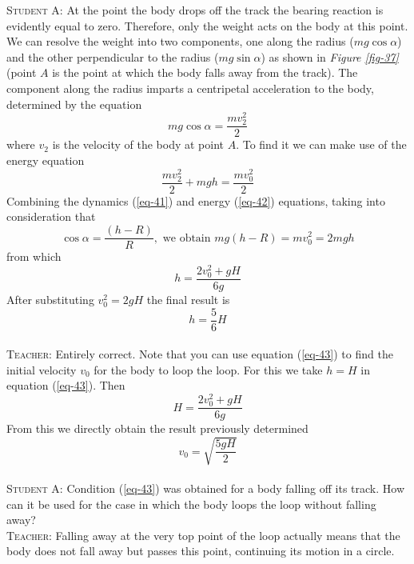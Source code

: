 \documentclass[a4paper,sfsidenotes]{tufte-book}
\begin{document}
\textsc{Student A:} At the point the body drops off the track the bearing reaction is evidently equal to zero. Therefore, only the weight acts on the body at this point. We can resolve the weight into two components, one along the radius ($mg \cos \alpha$) and the other perpendicular to the radius ($mg \sin \alpha$) as shown in \emph{Figure \ref{fig-37}} (point $A$ is the point at which the body falls away from the track). The component along the radius imparts a centripetal acceleration to the body, determined by the equation
\begin{equation}
mg \cos \alpha = \frac{mv_{2}^{2}}{2}
\label{eq-41}
\end{equation}
where $v_{2}$ is the velocity of the body at point $A$. To find it we can make use of the energy equation
\begin{equation}
\frac{mv_{2}^{2}}{2} + mgh = \frac{mv_{0}^{2}}{2} 
\label{eq-42}
\end{equation}
Combining the dynamics (\ref{eq-41}) and energy (\ref{eq-42}) equations, taking into consideration that 
\begin{equation*}
\cos \alpha = \frac{(h-R)}{R}, \, \, \text{we obtain} \, \, mg(h-R) = mv_{0}^{2} = 2mgh
\end{equation*}
from which
\begin{equation}
h = \frac{2v_{0}^{2}+gH}{6g} 
\label{eq-43}
\end{equation}
After substituting $v_{0}^{2}=2gH$ the final result is
\begin{equation*}
h = \frac{5}{6} H
\end{equation*}
\\
\textsc{Teacher:} Entirely correct. Note that you can use equation (\ref{eq-43}) to find the initial velocity $v_{0}$ for the body to loop the loop. For this we take $h=H$ in equation (\ref{eq-43}). Then
\begin{equation*}
H = \frac{2v_{0}^{2}+gH}{6g} 
\end{equation*}
From this we directly obtain the result previously determined
\begin{equation*}
v_{0} = \sqrt{\frac{5gH}{2}}
\end{equation*}
\\
\textsc{Student A:} Condition (\ref{eq-43}) was obtained for a body falling off its track. How can it be used for the case in which the body loops the loop without falling away?
\\
\textsc{Teacher:} Falling away at the very top point of the loop actually means that the body does not fall away but passes this point, continuing its motion in a circle.
\end{document}
